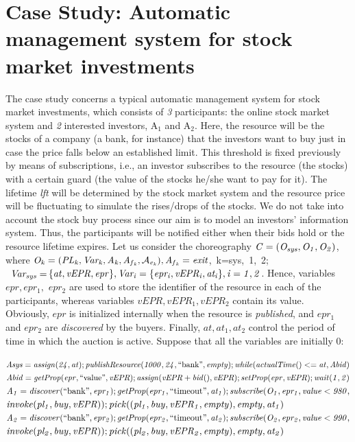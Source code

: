 \section{Case Study: Automatic management system for stock market investments}\label{cs}
The case study concerns a typical automatic management system for stock market investments, which consists of {\em 3} participants:
the online stock market system and {\em 2} interested investors, A$_1$ and A$_2$. Here, the resource will be the stocks of a company (a bank, for instance) that the investors want to buy just in case the price falls below an established limit. This threshold is fixed previously by means of subscriptions, i.e., an investor subscribes to the resource (the stocks) with a certain guard (the value of the stocks he/she want to pay for it). The lifetime {\em lft} will be determined by the stock market system and the resource price will be fluctuating to simulate the rises/drops of the stocks. We do not take into account the stock buy process since our aim is to model an investors' information system. Thus, the participants will be notified either when their bids hold or the resource lifetime expires.
Let us consider the choreography ${\it C=(O_{sys},O_1,O_2)}$, where
\mbox{${\it O_k=(PL_k,Var_k,A_k,A_{f{_k}},\mathcal{A}_{e{_k}}),A_{f{_k}}=exit}$,~k=sys,~1,~2;}\\~\mbox{${\it Var_{sys}=}$}${\it \{at,vEPR,epr\}, Var_i= \{epr_i,vEPR_i,at_i\}, i=1,2}$. Hence, variables $epr,epr_1,$ $epr_2$ are used to store the identifier of the resource in each of the participants, whereas variables $vEPR,vEPR_1,vEPR_2$ contain its value. Obviously, $epr$ is initialized internally when the resource is \emph{published}, and $epr_1$ and $epr_2$ are \emph{discovered} by the buyers. Finally, $at,at_1,at_2$ control the period of time in which the auction is active. Suppose that all the variables are initially $0$:
\begin{flushleft}
\small{
${\it Asys=assign(24,at);publishResource(1000,24,\textrm{``bank''},empty);while(actualTime()<=at,Abid)}$\\
${\it Abid=getProp(epr,\textrm{``value''},vEPR);assign(vEPR+bid(),vEPR);setProp(epr,vEPR);wait(1,2)}$\\%
${\it A_1=discover(\textrm{``bank''},epr_1);getProp(epr_1,\text{``timeout''},at_1);subscribe(O_1,epr_1,value<980,}$\\%
\hspace{0.9cm}${\it invoke(pl_1,buy,vEPR));pick((pl_1,buy,vEPR_1,empty),empty,at_1)}$\\
${\it A_2=discover(\textrm{``bank''},epr_2);getProp(epr_2,\textrm{``timeout''},at_2);subscribe(O_2,epr_2,value<990,}$\\%
\hspace{0.9cm}${\it invoke(pl_2,buy,vEPR));pick((pl_2,buy,vEPR_2,empty),empty,at_2)}$\\}
\end{flushleft}

